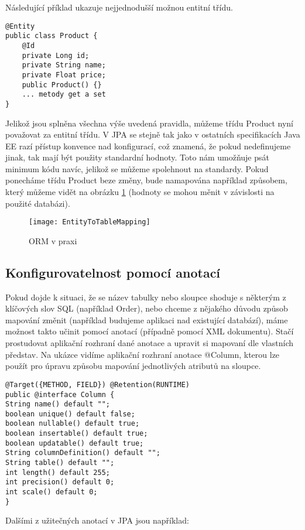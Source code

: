 \documentclass[122pt,oneside]{fithesis}
\begin{document}
Následující příklad ukazuje nejjednodušší možnou entitní třídu.

\begin{lstlisting}
@Entity
public class Product {
	@Id
	private Long id;
	private String name;
	private Float price;
	public Product() {}
	... metody get a set
}
\end{lstlisting}

Jelikož jsou splněna všechna výše uvedená pravidla, můžeme třídu Product nyní považovat za entitní třídu. V JPA se stejně tak jako v ostatních specifikacích Java EE razí přístup konvence nad konfigurací, což znamená, že pokud nedefinujeme jinak, tak mají být použity standardní hodnoty. Toto nám umožňuje psát minimum kódu navíc, jelikož se můžeme spolehnout na standardy. Pokud ponecháme třídu Product beze změny, bude namapována například způsobem, který můžeme vidět na obrázku \ref{img:orm} (hodnoty se mohou měnit v závislosti na použité databázi).

\begin{figure}[!ht]
\centering
\texttt{[image: EntityToTableMapping]}
\caption{ORM v praxi}
\label{img:orm}
\end{figure}

\subsection{Konfigurovatelnost pomocí anotací}
Pokud dojde k situaci, že se název tabulky nebo sloupce shoduje s některým z klíčových slov SQL (například Order), nebo chceme z nějakého důvodu způsob mapování změnit (například budujeme aplikaci nad existující databází), máme možnost takto učinit pomocí anotací (případně pomocí XML dokumentu). Stačí prostudovat aplikační rozhraní dané anotace a upravit si mapovaní dle vlastních představ. Na ukázce vidíme aplikační rozhraní anotace @Column, kterou lze použít pro úpravu způsobu mapování jednotlivých atributů na sloupce.

\begin{lstlisting}
@Target({METHOD, FIELD}) @Retention(RUNTIME)
public @interface Column {
String name() default "";
boolean unique() default false;
boolean nullable() default true;
boolean insertable() default true;
boolean updatable() default true;
String columnDefinition() default "";
String table() default "";
int length() default 255;
int precision() default 0;
int scale() default 0; 
}
\end{lstlisting}

Dalšími z užitečných anotací v JPA jsou například:
\end{document}
